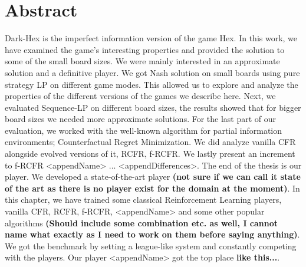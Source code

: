 \thispagestyle{acknowledgements}
\section*{Abstract}

Dark-Hex is the imperfect information version of the game Hex. In this work, we have examined 
the game's interesting properties and provided the solution to some of the small board sizes.
We were mainly interested in an approximate solution and a definitive player. We got Nash solution 
on small boards using pure strategy LP on different game modes.
This allowed us to explore and analyze the properties of the different versions of the games 
we describe here.
Next, we evaluated Sequence-LP on different board sizes, the results showed that for bigger 
board sizes we needed more approximate solutions.
For the last part of our evaluation, we worked with the well-known algorithm for partial 
information environments; Counterfactual Regret Minimization. We did analyze vanilla CFR 
alongside evolved versions of it, RCFR, f-RCFR. We lastly present an increment to f-RCFR 
<appendName> ... <appendDifferences>. The end of the thesis is our player. We developed a 
state-of-the-art player \textbf{(not sure if we can call it state of the art as there is 
no player exist for the domain at the moment)}. 
In this chapter, we have trained some classical Reinforcement 
Learning players, vanilla CFR, RCFR, f-RCFR, <appendName> and some other popular algorithms 
\textbf{(Should include some combination etc. as well, I cannot name what exactly as I need 
to work on them before saying anything)}. We got the benchmark by setting a league-like system 
and constantly competing with the players.
Our player <appendName> got the top place \textbf{like this...}.


